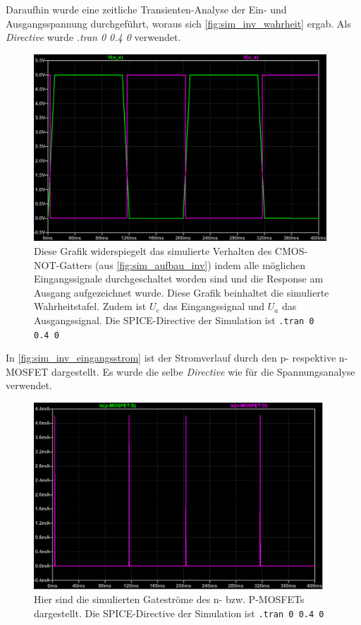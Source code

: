 \documentclass[12pt,english,ngerman]{scrartcl}
\begin{document}
Daraufhin wurde eine zeitliche Transienten-Analyse der Ein- und Ausgangsspannung durchgeführt,
woraus sich \autoref{fig:sim_inv_wahrheit} ergab. Als \textit{Directive} wurde \textit{.tran 0 0.4 0} verwendet.
\begin{figure}[H]
  \centering
  \includegraphics[width=\linewidth, height=7cm]{./simdaten_lab/cmos/inverter/kennlinie_einaus.png}
  \caption{Diese Grafik widerspiegelt das simulierte Verhalten des CMOS-NOT-Gatters (aus
    \autoref{fig:sim_aufbau_inv}) indem alle möglichen Eingangssignale
    durchgeschaltet worden sind und die Response am Ausgang aufgezeichnet
    wurde. Diese Grafik beinhaltet die simulierte Wahrheitstafel. Zudem ist
    $U_e$ das Eingangssignal und $U_a$ das Ausgangssignal. Die SPICE-Directive
    der Simulation ist \texttt{.tran 0 0.4 0}}
  \label{fig:sim_inv_wahrheit}
\end{figure}

In \autoref{fig:sim_inv_eingangsstrom} ist der Stromverlauf durch den p- respektive n-MOSFET
dargestellt. Es wurde die selbe \textit{Directive} wie für die Spannungsanalyse verwendet.

\begin{figure}[H]
  \centering
    \includegraphics[width=\linewidth, height=7cm]{./simdaten_lab/cmos/inverter/strom_correct_beide.png}
    \caption{Hier sind die simulierten Gateströme des n- bzw. P-MOSFETs
    dargestellt. Die SPICE-Directive der Simulation ist \texttt{.tran 0 0.4 0}}
  \label{fig:sim_inv_eingangsstrom}
\end{figure}
\end{document}

